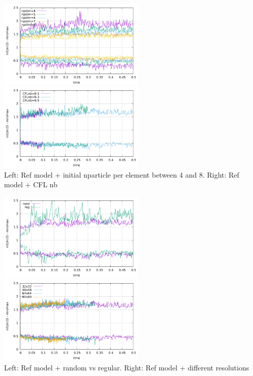 \begin{center}
\includegraphics[width=7cm]{python_codes/fieldstone_30/results_streamline/markercount_npd}
\includegraphics[width=7cm]{python_codes/fieldstone_30/results_streamline/markercount_cflnb}\\
{\captionfont Left: Ref model + initial nparticle per element between 4 and 8. Right: Ref model + CFL nb}
\end{center}

\begin{center}
\includegraphics[width=7cm]{python_codes/fieldstone_30/results_streamline/markercount_reg}
\includegraphics[width=7cm]{python_codes/fieldstone_30/results_streamline/markercount_res}\\
{\captionfont Left: Ref model + random vs regular. Right: Ref model + different resolutions}
\end{center}








